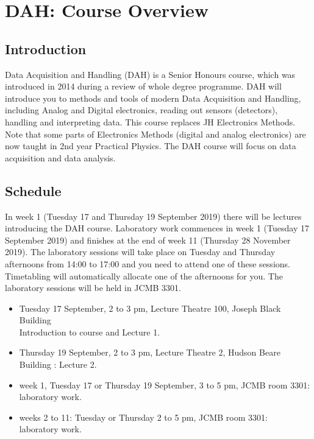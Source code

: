 \chapter{DAH: Course Overview}
\label{sec:overview}

\section{Introduction}

Data Acquisition and Handling (DAH) is a  Senior Honours course, which was introduced in 2014 during a review of whole degree programme. DAH will introduce you to methods and tools of modern Data Acquisition and Handling, including Analog and Digital electronics, reading out sensors (detectors), handling and interpreting data. This course replaces JH Electronics Methods. Note that some parts of Electronics Methods (digital and analog electronics) are now taught in 2nd year Practical Physics. The DAH course will focus on data acquisition and data analysis.


\section{Schedule}
In week 1 (Tuesday 17 and Thursday 19 September 2019)
there will be lectures %
introducing the DAH course.
Laboratory work commences in week 1 (Tuesday 17 September 2019) and finishes at the end of week 11 (Thursday 28 November 2019). The laboratory sessions will take place on Tuesday and Thursday afternoons from 14:00 to 17:00 and you need to attend one of these sessions. Timetabling will automatically allocate one of the afternoons for you. The laboratory sessions will be held in JCMB 3301.
\begin{itemize}
\item Tuesday 17 September, 2 to 3 pm,  Lecture Theatre 100, Joseph Black Building \\Introduction to course and Lecture 1.
\item Thursday 19 September, 2 to 3 pm, Lecture Theatre 2, Hudson Beare Building : Lecture 2.
\item week 1, Tuesday 17 or Thursday  19 September, 3 to 5 pm, JCMB room 3301: \\laboratory work.
\item weeks 2 to 11:  Tuesday or Thursday 2 to 5 pm, JCMB room 3301: \\laboratory work.
\end{itemize}



